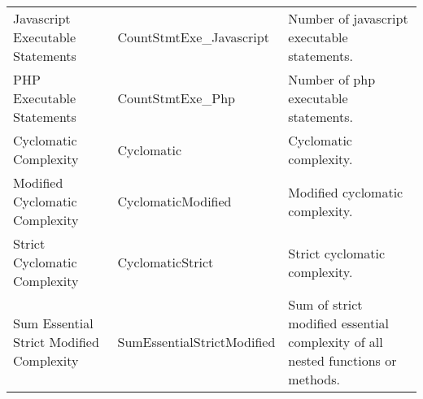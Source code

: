 \begin{table}
\begin{tabular}{p{}p{}p{}}
		Javascript Executable Statements & CountStmtExe\_Javascript & Number of javascript executable statements.\\
		PHP Executable Statements & CountStmtExe\_Php & Number of php executable statements.\\
		Cyclomatic Complexity & Cyclomatic & Cyclomatic complexity.\\
		Modified Cyclomatic Complexity & CyclomaticModified & Modified cyclomatic complexity.\\
		Strict Cyclomatic Complexity & CyclomaticStrict & Strict cyclomatic complexity.\\
		Sum Essential Strict Modified Complexity & SumEssentialStrictModified & Sum of strict modified essential complexity of all nested functions or methods.\\
	\end{tabular}
\end{table}

